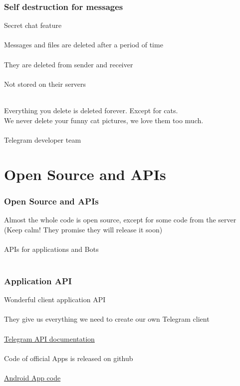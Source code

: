 \documentclass{beamer}
\begin{document}
\begin{frame}
\frametitle{Self destruction for messages}
Secret chat feature\\~\\
Messages and files are deleted after a period of time\\~\\
They are deleted from sender and receiver\\~\\
Not stored on their servers\\~\\
\begin{center}
Everything you delete is deleted forever. Except for cats.\\
We never delete your funny cat pictures, we love them too much.\\~\\
Telegram developer team
\end{center}
\end{frame}

\section{Open Source and APIs}

\begin{frame}
\frametitle{Open Source and APIs}
Almost the whole code is open source, except for some code from the server (Keep calm! They promise they will release it soon)\\~\\
APIs for applications and Bots\\~\\
\end{frame}


\begin{frame}
\frametitle{Application API}
Wonderful client application API\\~\\
They give us everything we need to create our own Telegram client\\~\\
\href{https://core.telegram.org/\#telegram-api}{\color{blue}Telegram API documentation}\\~\\
Code of official Apps is released on github\\~\\
\href{https://github.com/DrKLO/Telegram}{\color{blue}Android App code}\\~\\
\end{frame}
\end{document}
